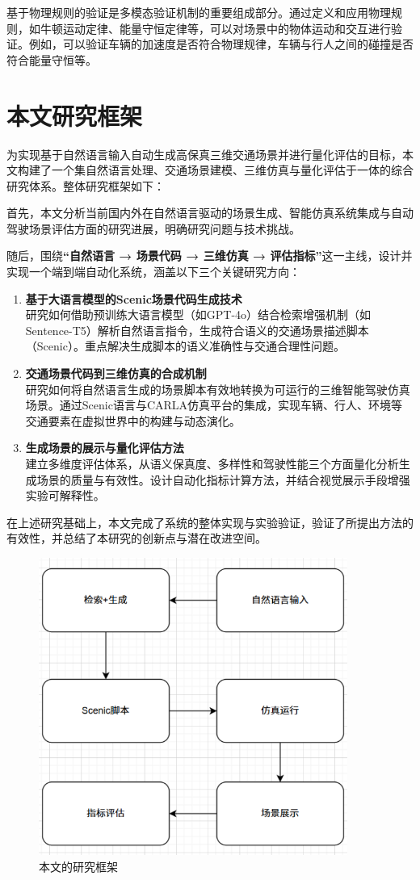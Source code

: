 	基于物理规则的验证是多模态验证机制的重要组成部分。通过定义和应用物理规则，如牛顿运动定律、能量守恒定律等，可以对场景中的物体运动和交互进行验证。例如，可以验证车辆的加速度是否符合物理规律，车辆与行人之间的碰撞是否符合能量守恒等。

\section{本文研究框架}

为实现基于自然语言输入自动生成高保真三维交通场景并进行量化评估的目标，本文构建了一个集自然语言处理、交通场景建模、三维仿真与量化评估于一体的综合研究体系。整体研究框架如下：

首先，本文分析当前国内外在自然语言驱动的场景生成、智能仿真系统集成与自动驾驶场景评估方面的研究进展，明确研究问题与技术挑战。

随后，围绕\textbf{“自然语言 → 场景代码 → 三维仿真 → 评估指标”}这一主线，设计并实现一个端到端自动化系统，涵盖以下三个关键研究方向：

\begin{enumerate}
	\item \textbf{基于大语言模型的Scenic场景代码生成技术} \\
	研究如何借助预训练大语言模型（如GPT-4o）结合检索增强机制（如Sentence-T5）解析自然语言指令，生成符合语义的交通场景描述脚本（Scenic）。重点解决生成脚本的语义准确性与交通合理性问题。
	
	\item \textbf{交通场景代码到三维仿真的合成机制} \\
	研究如何将自然语言生成的场景脚本有效地转换为可运行的三维智能驾驶仿真场景。通过Scenic语言与CARLA仿真平台的集成，实现车辆、行人、环境等交通要素在虚拟世界中的构建与动态演化。
	
	\item \textbf{生成场景的展示与量化评估方法} \\
	建立多维度评估体系，从语义保真度、多样性和驾驶性能三个方面量化分析生成场景的质量与有效性。设计自动化指标计算方法，并结合视觉展示手段增强实验可解释性。
\end{enumerate}

在上述研究基础上，本文完成了系统的整体实现与实验验证，验证了所提出方法的有效性，并总结了本研究的创新点与潜在改进空间。

\begin{figure}[H]
	\centering
	\includegraphics[width=0.9\textwidth]{../images/研究架构图.pdf} 
	\caption{本文的研究框架}
	\label{fig:research_framework}
\end{figure}